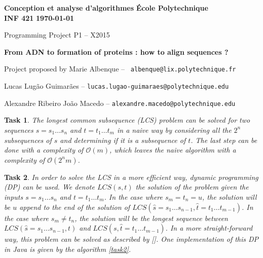 \documentclass[10pt]{article} %
\theoremstyle{problemstyle}
\newtheorem{exercise}{Task}	%
\renewcommand*{\O}{\mathcal{O}}
\begin{document}
\noindent
\normalsize\textbf{Conception et analyse d'algorithmes} \hfill \textbf{École Polytechnique}\\
\normalsize\textbf{INF 421} \hfill \textbf{\today}\vspace{20pt}
\centerline{\Large Programming Project P1 – X2015}\vspace{5pt}
\centerline{\Large \textbf{From ADN to formation of proteins : how to align sequences ?}}\vspace{3pt}
\centerline{Project proposed by Marie Albenque -- \texttt{ albenque@lix.polytechnique.fr}}\vspace{13pt}
\centerline{Lucas Lugão Guimarães -- \texttt{lucas.lugao-guimaraes@polytechnique.edu}}
\centerline{Alexandre Ribeiro João Macedo --  \texttt{alexandre.macedo@polytechnique.edu}}\vspace{20pt}


\begin{exercise}
The longest common subsequence (LCS) problem can be solved for two sequences $s=s_1\dots s_n$ and $t=t_1\dots t_m$ in a naive way by considering all the $2^{n}$ subsequences of $s$ and determining if it is a subsequence of $t$. The last step can be done with a complexity of $\O(m)$, which leaves the naive algorithm with a complexity of $\O(2^{n}m)$.
\end{exercise}

\begin{exercise}
In order to solve the LCS in a more efficient way, dynamic programming (DP) can be used. We denote $LCS(s,t)$ the solution of the problem given the inputs $s=s_1\dots s_n$ and $t=t_1\dots t_m$. In the case where $s_m = t_n = u$, the solution will be $u$ append to the end of the solution of $LCS(\hat{s}=s_1\dots s_{n-1}, \hat{t}=t_1\dots t_{m-1})$. In the case where $s_m \neq t_n$, the solution will be the longest sequence between $LCS(\hat{s}=s_1\dots s_{n-1}, t)$ and $LCS(s, \hat{t}=t_1\dots t_{m-1})$. In a more straight-forward way, this problem can be solved as described by [\cite{jones}]. One implementation of this DP in Java is given by the algorithm \ref{task2}.
\begin{comment}
This solution consists of filling two matrices $A_{n+1,m+1}$ and $B_{n+1,m+1}$, following the given rules: initialize the first line and the first column of $A$ in zeros, fill this matrix according to 
\begin{align*}
A_{i,j}
\end{align*}
\end{comment}


\end{exercise}
\end{document}
